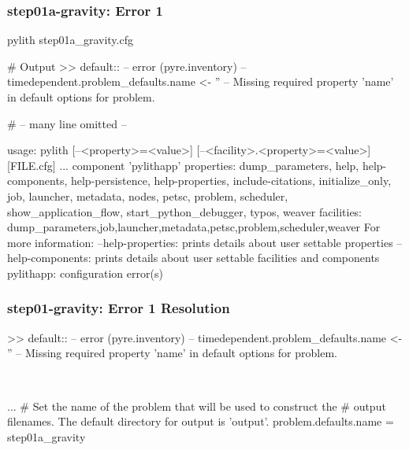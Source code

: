 \documentclass[aspectratio=169]{beamer}
\begin{document}
\begin{frame}[fragile]
  \frametitle{{\ttfamily step01a-gravity}: Error 1}

\begin{pyrejournal}
pylith step01a_gravity.cfg

# Output
>> {default}::
-- error (pyre.inventory)
-- timedependent.problem_defaults.name <- ''
-- Missing required property 'name' in default options for problem.

# -- many line omitted --

usage: pylith [--<property>=<value>] [--<facility>.<property>=<value>] [FILE.cfg] ...
component 'pylithapp'
    properties: dump_parameters, help, help-components, help-persistence, help-properties, include-citations, initialize_only, job, launcher, metadata, nodes, petsc, problem, scheduler, show_application_flow, start_python_debugger, typos, weaver
    facilities: dump_parameters,job,launcher,metadata,petsc,problem,scheduler,weaver
For more information:
  --help-properties: prints details about user settable properties
  --help-components: prints details about user settable facilities and components
pylithapp: configuration error(s)
\end{pyrejournal}

\end{frame}


\begin{frame}[t,fragile]
  \frametitle{{\ttfamily step01-gravity}: Error 1 Resolution}

  \tserror
  \begin{pyrejournal}
  >> {default}::
  -- error (pyre.inventory)
  -- timedependent.problem_defaults.name <- ''
  -- Missing required property 'name' in default options for problem.
  \end{pyrejournal}

  \pause\\[1pt]

  \begin{cfgcode}
    [pylithapp]
    ...
    # Set the name of the problem that will be used to construct the
    # output filenames. The default directory for output is 'output'.
    problem.defaults.name = step01a_gravity
  \end{cfgcode}

\end{frame}
\end{document}
